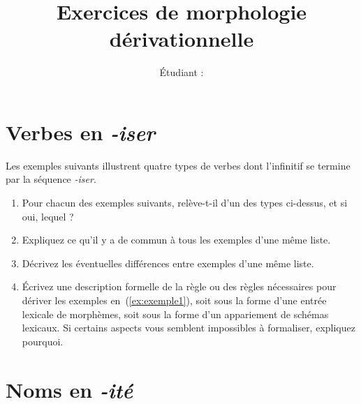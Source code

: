 

\title{Exercices de morphologie dérivationnelle}
\author{}
\date{Étudiant : \student}

\maketitle


\section{Verbes en \emph{-iser}}


Les exemples suivants illustrent quatre types de verbes dont l'infinitif  se termine par la séquence \emph{-iser}.

\vspace{-.5\baselineskip}
\begin{exe}
\ex\begin{xlist}
\ex \adjexun
\ex \nounexun
\ex \label{ex:exemple1} \prefixexun
\ex \simplexexun
\end{xlist}
\end{exe}

\begin{enumerate}
\item Pour chacun des exemples suivants, relève-t-il d'un des types ci-dessus, et si oui, lequel ?
\begin{exe}
\ex \aclasserexun
\end{exe}
\item Expliquez ce qu'il y a de commun à tous les exemples d'une même liste.

\item Décrivez les éventuelles différences entre exemples d'une même liste.

\item Écrivez une description formelle de la règle ou des règles nécessaires pour dériver les exemples en~(\ref{ex:exemple1}), soit sous la forme d'une entrée lexicale de morphèmes, soit sous la forme d'un appariement de schémas lexicaux. Si certains aspects vous semblent impossibles à formaliser, expliquez pourquoi.

\end{enumerate}


\section{Noms en \emph{-ité}}

